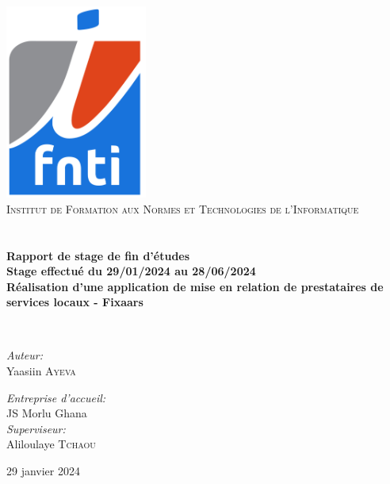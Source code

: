 \begin{titlepage}
\begin{center}

\includegraphics[width=0.35\textwidth]{assets/presentation/ifnti}~\\[1cm]

{\fontsize{13.5pt}{10pt}\selectfont
\textsc{Institut de Formation aux Normes et Technologies de l'Informatique}
}\\[1cm]

\textsc{\Large }\\[0.5cm]

\HRule \\[0.4cm]

{\huge \bfseries 
Rapport de stage de fin d’études \\ Stage effectué du 29/01/2024 au 28/06/2024 \\
Réalisation d’une application de mise en relation de prestataires de services locaux - Fixaars\\[0.4cm] }


\HRule \\[1.5cm]

\begin{minipage}{0.4\textwidth}
\begin{flushleft} \large
\emph{Auteur:}\\
Yaasiin \textsc{Ayeva}\\
\end{flushleft}
\end{minipage}
\begin{minipage}{0.4\textwidth}
\begin{flushright} \large
\emph{Entreprise d'accueil:} \\
JS Morlu Ghana \textsc{}\\
\emph{Superviseur:} \\
Aliloulaye \textsc{Tchaou}
\end{flushright}
\end{minipage}

\vfill

{\large 29 janvier 2024}

\end{center}
\end{titlepage}